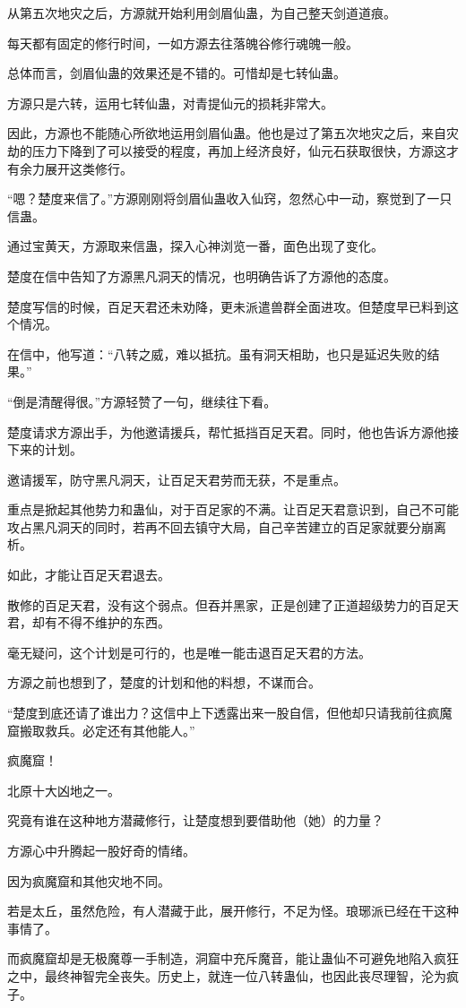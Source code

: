 \begin{this_body}
从第五次地灾之后，方源就开始利用剑眉仙蛊，为自己整天剑道道痕。

每天都有固定的修行时间，一如方源去往落魄谷修行魂魄一般。

总体而言，剑眉仙蛊的效果还是不错的。可惜却是七转仙蛊。

方源只是六转，运用七转仙蛊，对青提仙元的损耗非常大。

因此，方源也不能随心所欲地运用剑眉仙蛊。他也是过了第五次地灾之后，来自灾劫的压力下降到了可以接受的程度，再加上经济良好，仙元石获取很快，方源这才有余力展开这类修行。

“嗯？楚度来信了。”方源刚刚将剑眉仙蛊收入仙窍，忽然心中一动，察觉到了一只信蛊。

通过宝黄天，方源取来信蛊，探入心神浏览一番，面色出现了变化。

楚度在信中告知了方源黑凡洞天的情况，也明确告诉了方源他的态度。

楚度写信的时候，百足天君还未劝降，更未派遣兽群全面进攻。但楚度早已料到这个情况。

在信中，他写道：“八转之威，难以抵抗。虽有洞天相助，也只是延迟失败的结果。”

“倒是清醒得很。”方源轻赞了一句，继续往下看。

楚度请求方源出手，为他邀请援兵，帮忙抵挡百足天君。同时，他也告诉方源他接下来的计划。

邀请援军，防守黑凡洞天，让百足天君劳而无获，不是重点。

重点是掀起其他势力和蛊仙，对于百足家的不满。让百足天君意识到，自己不可能攻占黑凡洞天的同时，若再不回去镇守大局，自己辛苦建立的百足家就要分崩离析。

如此，才能让百足天君退去。

散修的百足天君，没有这个弱点。但吞并黑家，正是创建了正道超级势力的百足天君，却有不得不维护的东西。

毫无疑问，这个计划是可行的，也是唯一能击退百足天君的方法。

方源之前也想到了，楚度的计划和他的料想，不谋而合。

“楚度到底还请了谁出力？这信中上下透露出来一股自信，但他却只请我前往疯魔窟搬取救兵。必定还有其他能人。”

疯魔窟！

北原十大凶地之一。

究竟有谁在这种地方潜藏修行，让楚度想到要借助他（她）的力量？

方源心中升腾起一股好奇的情绪。

因为疯魔窟和其他灾地不同。

若是太丘，虽然危险，有人潜藏于此，展开修行，不足为怪。琅琊派已经在干这种事情了。

而疯魔窟却是无极魔尊一手制造，洞窟中充斥魔音，能让蛊仙不可避免地陷入疯狂之中，最终神智完全丧失。历史上，就连一位八转蛊仙，也因此丧尽理智，沦为疯子。

\end{this_body}

